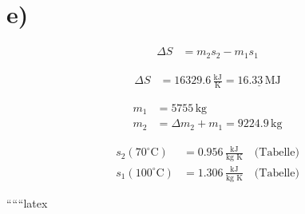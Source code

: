 

\section*{e)}
\begin{align*}
\Delta S &= m_2 s_2 - m_1 s_1
\end{align*}

\begin{align*}
\Delta S &= 16329.6 \, \frac{\text{kJ}}{\text{K}} = \underline{16.33 \, \text{MJ}}
\end{align*}

\begin{align*}
m_1 &= 5755 \, \text{kg} \\
m_2 &= \Delta m_2 + m_1 = 9224.9 \, \text{kg}
\end{align*}

\begin{align*}
s_2 (70^\circ \text{C}) &= 0.956 \, \frac{\text{kJ}}{\text{kg K}} \quad \text{(Tabelle)} \\
s_1 (100^\circ \text{C}) &= 1.306 \, \frac{\text{kJ}}{\text{kg K}} \quad \text{(Tabelle)}
\end{align*}

``````latex